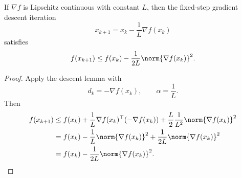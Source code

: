 \begin{theorem}\label{thm:l2-gradient-descent-with-step-gives-sufficient-decrease}
	If $\nabla f$ is Lipschitz continuous with constant $L$, then the fixed-step gradient descent iteration
	\[
		x_{k+1}=x_k-\frac{1}{L}\nabla f(x_k)
	\]
	satisfies
	\[
		f(x_{k+1})
		\le
		f(x_k)-\frac{1}{2L}\norm{\nabla f(x_k)}^2.
	\]
\end{theorem}
\begin{proof}
	Apply the descent lemma with
	\[
		d_k=-\nabla f(x_k),
		\qquad
		\alpha=\frac{1}{L}.
	\]
	Then
	\begin{align*}
		f(x_{k+1})
		 & \le f(x_k)+\frac{1}{L}\nabla f(x_k)^\top(-\nabla f(x_k))
		+\frac{L}{2}\frac{1}{L^2}\norm{\nabla f(x_k)}^2 \\
		 & = f(x_k)-\frac{1}{L}\norm{\nabla f(x_k)}^2
		+\frac{1}{2L}\norm{\nabla f(x_k)}^2 \\
		 & = f(x_k)-\frac{1}{2L}\norm{\nabla f(x_k)}^2.
	\end{align*}
\end{proof}

